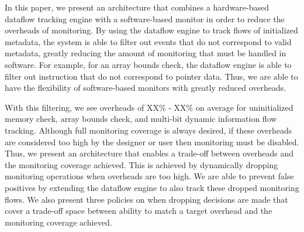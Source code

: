 
In this paper, we present an architecture that combines a hardware-based
dataflow tracking engine with a software-based monitor in order to reduce the
overheads of monitoring. By using the dataflow engine to track flows of
initialized metadata, the system is able to filter out events that do not
correspond to valid metadata, greatly reducing the amount of monitoring that
must be handled in software. For example, for an array
bounds check, the dataflow engine is able to filter out instruction that do not
correspond to pointer data. Thus, we are able to have the flexibility of
software-based monitors with greatly reduced overheads.

With this filtering, we see overheads of XX\% - XX\% on average for
uninitialized memory check, array bounds check, and multi-bit dynamic
information flow tracking. Although full monitoring coverage is always desired,
if these overheads are considered too high by the designer or user then
monitoring must be disabled.
Thus, we present an architecture that enables a trade-off between overheads and
the monitoring coverage achieved. This is achieved by dynamically dropping
monitoring operations when overheads are too high. We are able to prevent false
positives by extending the dataflow engine to also track these dropped
monitoring flows. We also present three policies on when dropping decisions are
made that cover a trade-off space between ability to match a target overhead
and the monitoring coverage achieved.

